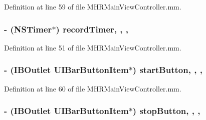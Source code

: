 Definition at line 59 of file M\+H\+R\+Main\+View\+Controller.\+mm.

\hypertarget{category_m_h_r_main_view_controller_07_08_a1f1639552968eeba13ed2b4575bea129}{
\subsubsection[{record\+Timer}]{\setlength{\rightskip}{0pt plus 5cm}-\/ (N\+S\+Timer$\ast$) record\+Timer\hspace{0.3cm}{\ttfamily [read]}, {\ttfamily [write]}, {\ttfamily [nonatomic]}, {\ttfamily [strong]}}}\label{category_m_h_r_main_view_controller_07_08_a1f1639552968eeba13ed2b4575bea129}


Definition at line 51 of file M\+H\+R\+Main\+View\+Controller.\+mm.

\hypertarget{category_m_h_r_main_view_controller_07_08_a98273435af4fbcd1e437f257bb9ced12}{
\subsubsection[{start\+Button}]{\setlength{\rightskip}{0pt plus 5cm}-\/ (I\+B\+Outlet U\+I\+Bar\+Button\+Item$\ast$) start\+Button\hspace{0.3cm}{\ttfamily [read]}, {\ttfamily [write]}, {\ttfamily [nonatomic]}, {\ttfamily [strong]}}}\label{category_m_h_r_main_view_controller_07_08_a98273435af4fbcd1e437f257bb9ced12}


Definition at line 60 of file M\+H\+R\+Main\+View\+Controller.\+mm.

\hypertarget{category_m_h_r_main_view_controller_07_08_a0e349ec3fa2cecae6592c8d9489dedfe}{
\subsubsection[{stop\+Button}]{\setlength{\rightskip}{0pt plus 5cm}-\/ (I\+B\+Outlet U\+I\+Bar\+Button\+Item$\ast$) stop\+Button\hspace{0.3cm}{\ttfamily [read]}, {\ttfamily [write]}, {\ttfamily [nonatomic]}, {\ttfamily [strong]}}}\label{category_m_h_r_main_view_controller_07_08_a0e349ec3fa2cecae6592c8d9489dedfe}


